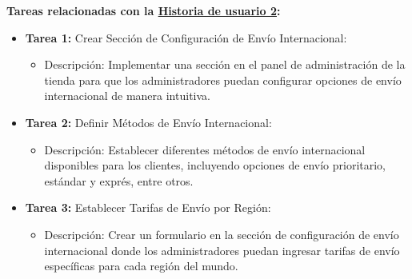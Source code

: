 \documentclass[12pt]{article}
\begin{document}
\textbf{Tareas relacionadas con la \hyperref[sec:historia2]{Historia de usuario 2}:}
\begin{itemize}
    \item \textbf{Tarea 1:} Crear Sección de Configuración de Envío Internacional:
          \begin{itemize}[label=--]
              \item Descripción: Implementar una sección en el panel de administración de la tienda para que los administradores puedan configurar opciones de envío internacional de manera intuitiva.
          \end{itemize}
    \item \textbf{Tarea 2:} Definir Métodos de Envío Internacional:
          \begin{itemize}[label=--]
              \item Descripción: Establecer diferentes métodos de envío internacional disponibles para los clientes, incluyendo opciones de envío prioritario, estándar y exprés, entre otros.
          \end{itemize}
    \item \textbf{Tarea 3:} Establecer Tarifas de Envío por Región:
          \begin{itemize}[label=--]
              \item Descripción: Crear un formulario en la sección de configuración de envío internacional donde los administradores puedan ingresar tarifas de envío específicas para cada región del mundo.
          \end{itemize}
\end{itemize}
\end{document}
